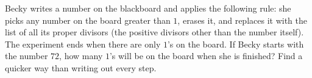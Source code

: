 Becky writes a number on the blackboard and applies the following rule: she picks any number on the board greater than $1$, erases it, and replaces it with the list of all its proper divisors (the positive divisors other than the number itself). The experiment ends when there are only $1$'s on the board. If Becky starts with the number $72$, how many $1$'s will be on the board when she is finished? Find a quicker way than writing out every step.
